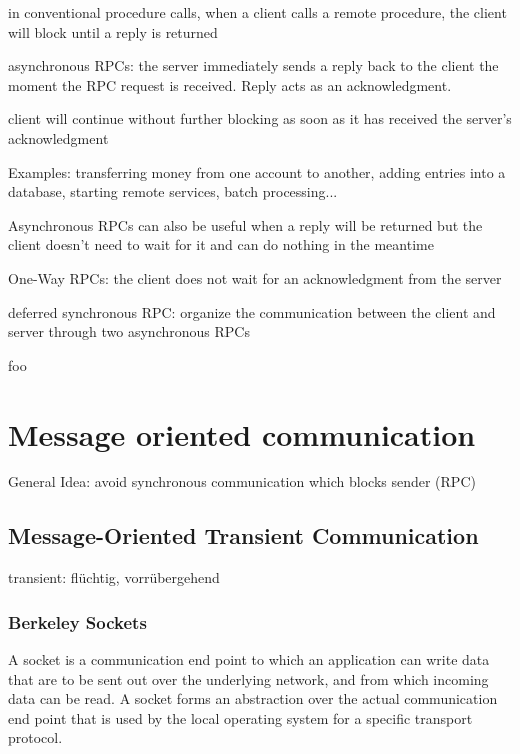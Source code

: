 \documentclass[ngerman,a4paper]{report}
\begin{document}
\begin{compactitem}
	\item in conventional procedure calls, when a client calls a remote procedure, the client will block until a reply is returned
	\item asynchronous RPCs: the server immediately sends a reply back to the client the moment the RPC request is received. Reply acts as an acknowledgment.
	\item client will continue without further blocking as soon as it has received the server's acknowledgment
	\item Examples: transferring money from one account to another, adding entries into a database, starting remote services, batch processing...
	\item Asynchronous RPCs can also be useful when a reply will be returned but the client doesn't need to wait for it and can do nothing in the meantime
	\item One-Way RPCs: the client does not wait for an acknowledgment from the server
	\item deferred synchronous RPC: organize the communication between the client and server through two asynchronous RPCs
\end{compactitem}

\begin{compactitem}
	\item foo
\end{compactitem}

\section{Message oriented communication}

General Idea: avoid synchronous communication which blocks sender (RPC)

\subsection{Message-Oriented Transient Communication}

transient: flüchtig, vorrübergehend

\subsubsection{Berkeley Sockets}

A socket is a communication end point to which an application can write data that are to be sent out over the underlying network, and from which incoming data can be read. A socket forms an abstraction over the actual communication end point that is used by the local operating system for a specific transport protocol.
\end{document}
